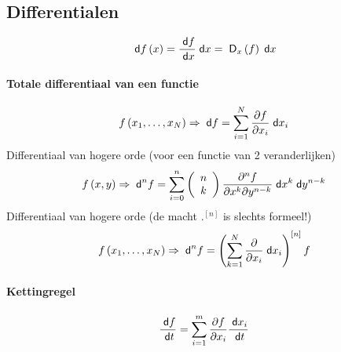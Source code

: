 \subsection{Differentialen}
\label{sec:Differentialen}
\[
  \;\textsf{d}f\left(x\right) = \frac{\;\textsf{d}f}{\;\textsf{d}x} \;\textsf{d}x
                      = \;\textsf{D}_x\left(f\right) \;\textsf{d}x
\]
\paragraph{Totale differentiaal van een functie}
\[
  f \left( x_1 , \ldots , x_N \right) 
  \Rightarrow 
  \d{f} = \sum_{i=1}^N \frac{\pd{f}}{\pd{x_i}}\d{x_i} 
\]
Differentiaal van hogere orde (voor een functie van 2 veranderlijken)
\[
  f \left( x,y \right) 
  \Rightarrow
  \d^n{f} = \sum_{i=0}^{n} \combination{n}{k} \frac{\pd^{n}{f}}{\pd{x}^{k}\pd{y}^{n-k}} \d{x}^{k} \d{y}^{n-k}
\]
Differentiaal van hogere orde (de macht $.^{\left[n\right]}$ is slechts formeel!)
\[
  f \left( x_1 , \ldots , x_N \right)
  \Rightarrow
  \d^n{f} = \left(\sum_{k=1}^{N} \frac{\pd{}}{\pd{x_i}}\d{x_i}  \right)^{\left[n\right]}f
\]

\paragraph{Kettingregel}
\[
  \frac{\;\textsf{d}f}{\;\textsf{d}t} = \sum^m_{i=1} \frac{\partial f}{\partial x_i} \frac{\;\textsf{d}x_i}{\;\textsf{d}t}
\]